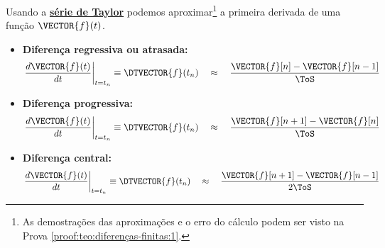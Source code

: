 \begin{theorem}
\label{teo:diferenças-finitas:1}
Usando a \hyperref[def:taylor]{\textbf{série de Taylor}} podemos aproximar\footnote{As
demostrações das aproximações e o erro do cálculo podem ser visto na Prova \ref{proof:teo:diferenças-finitas:1}.} 
a primeira derivada de uma função $\VECTOR{f}(t)$.
\begin{itemize}
\item \textbf{Diferença regressiva ou atrasada:}
\begin{equation}
\left.\frac{d\VECTOR{f}(t)}{dt}\right|_{t=t_n}\equiv \DTVECTOR{f}(t_n)
\quad \approx \quad
\frac{\VECTOR{f}[n]-\VECTOR{f}[n-1]}{\ToS}
\end{equation}
\item \textbf{Diferença progressiva:}
\begin{equation}
\left.\frac{d\VECTOR{f}(t)}{dt}\right|_{t=t_n}\equiv \DTVECTOR{f}(t_n)
\quad \approx \quad
\frac{\VECTOR{f}[n+1]-\VECTOR{f}[n]}{\ToS}
\end{equation}
\item \textbf{Diferença central:}
\begin{equation}
\left.\frac{d\VECTOR{f}(t)}{dt}\right|_{t=t_n}\equiv \DTVECTOR{f}(t_n)
\quad \approx \quad
\frac{\VECTOR{f}[n+1]-\VECTOR{f}[n-1]}{2\ToS}
\end{equation}
\end{itemize}
\end{theorem}



